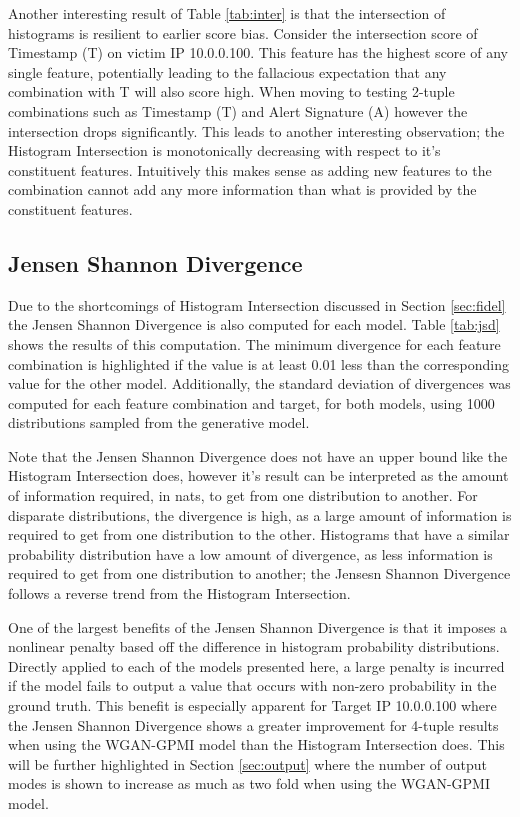 Another interesting result of Table \ref{tab:inter} is that the intersection of histograms is resilient to earlier score bias. Consider the intersection score of Timestamp (T) on victim IP 10.0.0.100. This feature has the highest score of any single feature, potentially leading to the fallacious expectation that any combination with T will also score high. When moving to testing 2-tuple combinations such as Timestamp (T) and Alert Signature (A) however the intersection drops significantly. This leads to another interesting observation; the Histogram Intersection is monotonically decreasing with respect to it's constituent features. Intuitively this makes sense as adding new features to the combination cannot add any more information than what is provided by the constituent features.

\subsection{Jensen Shannon Divergence}

Due to the shortcomings of Histogram Intersection discussed in Section \ref{sec:fidel} the Jensen Shannon Divergence is also computed for each model. Table \ref{tab:jsd} shows the results of this computation. The minimum divergence for each feature combination is highlighted if the value is at least 0.01 less than the corresponding value for the other model. Additionally, the standard deviation of divergences was computed for each feature combination and target, for both models, using 1000 distributions sampled from the generative model.

Note that the Jensen Shannon Divergence does not have an upper bound like the Histogram Intersection does, however it's result can be interpreted as the amount of information required, in nats, to get from one distribution to another. For disparate distributions, the divergence is high, as a large amount of information is required to get from one distribution to the other. Histograms that have a similar probability distribution have a low amount of divergence, as less information is required to get from one distribution to another; the Jensesn Shannon Divergence follows a reverse trend from the Histogram Intersection.

One of the largest benefits of the Jensen Shannon Divergence is that it imposes a nonlinear penalty based off the difference in histogram probability distributions. Directly applied to each of the models presented here, a large penalty is incurred if the model fails to output a value that occurs with non-zero probability in the ground truth. This benefit is especially apparent for Target IP 10.0.0.100 where the Jensen Shannon Divergence shows a greater improvement for  4-tuple results when using the WGAN-GPMI model than the Histogram Intersection does. This will be further highlighted in Section \ref{sec:output} where the number of output modes is shown to increase as much as two fold when using the WGAN-GPMI model. 

